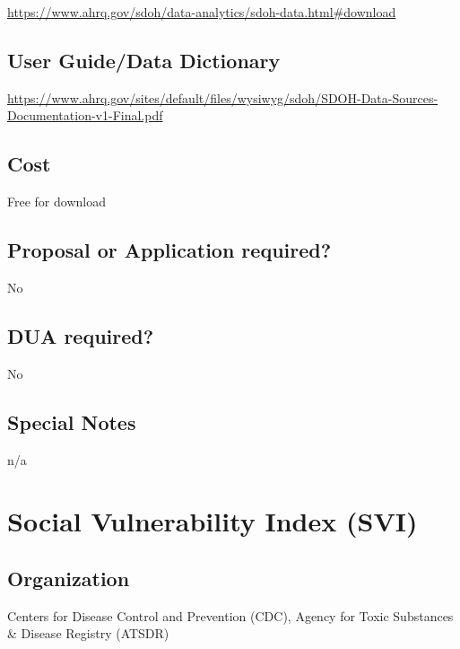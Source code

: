 \documentclass[
]{book}
\begin{document}
\url{https://www.ahrq.gov/sdoh/data-analytics/sdoh-data.html\#download}

\hypertarget{user-guidedata-dictionary-80}{%
\section{User Guide/Data Dictionary}\label{user-guidedata-dictionary-80}}

\url{https://www.ahrq.gov/sites/default/files/wysiwyg/sdoh/SDOH-Data-Sources-Documentation-v1-Final.pdf}

\hypertarget{cost-80}{%
\section{Cost}\label{cost-80}}

Free for download

\hypertarget{proposal-or-application-required-80}{%
\section{Proposal or Application required?}\label{proposal-or-application-required-80}}

No

\hypertarget{dua-required-80}{%
\section{DUA required?}\label{dua-required-80}}

No

\hypertarget{special-notes-80}{%
\section{Special Notes}\label{special-notes-80}}

n/a

\mainmatter

\hypertarget{social-vulnerability-index-svi}{%
\chapter{Social Vulnerability Index (SVI)}\label{social-vulnerability-index-svi}}

\hypertarget{organization-81}{%
\section{Organization}\label{organization-81}}

Centers for Disease Control and Prevention (CDC), Agency for Toxic Substances \& Disease Registry (ATSDR)
\end{document}
